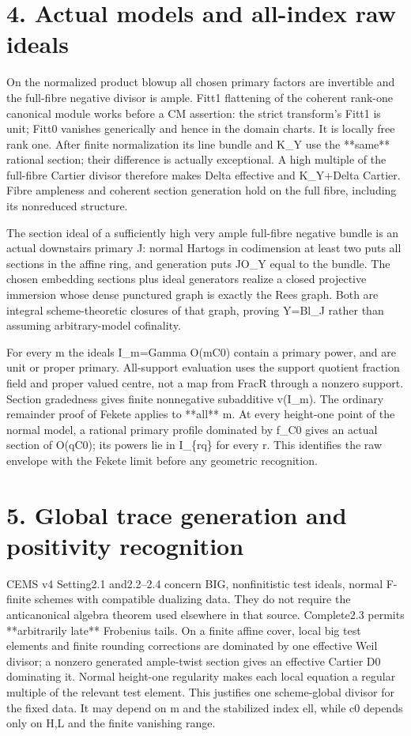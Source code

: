 \documentclass[11pt]{article}
\begin{document}
\section{4. Actual models and all-index raw ideals}

On the normalized product blowup all chosen primary factors are invertible and the full-fibre negative divisor is ample. Fitt1 flattening of the coherent rank-one canonical module works before a CM assertion: the strict transform's Fitt1 is unit; Fitt0 vanishes generically and hence in the domain charts. It is locally free rank one. After finite normalization its line bundle and K\_Y use the **same** rational section; their difference is actually exceptional. A high multiple of the full-fibre Cartier divisor therefore makes Delta effective and K\_Y+Delta Cartier. Fibre ampleness and coherent section generation hold on the full fibre, including its nonreduced structure.

The section ideal of a sufficiently high very ample full-fibre negative bundle is an actual downstairs primary J: normal Hartogs in codimension at least two puts all sections in the affine ring, and generation puts JO\_Y equal to the bundle. The chosen embedding sections plus ideal generators realize a closed projective immersion whose dense punctured graph is exactly the Rees graph. Both are integral scheme-theoretic closures of that graph, proving Y=Bl\_J rather than assuming arbitrary-model cofinality.

For every m the ideals I\_m=Gamma O(mC0) contain a primary power, and are unit or proper primary. All-support evaluation uses the support quotient fraction field and proper valued centre, not a map from FracR through a nonzero support. Section gradedness gives finite nonnegative subadditive v(I\_m). The ordinary remainder proof of Fekete applies to **all** m. At every height-one point of the normal model, a rational primary profile dominated by f\_C0 gives an actual section of O(qC0); its powers lie in I\_\{rq\} for every r. This identifies the raw envelope with the Fekete limit before any geometric recognition.

\section{5. Global trace generation and positivity recognition}

CEMS v4 Setting2.1 and2.2--2.4 concern BIG, nonfinitistic test ideals, normal F-finite schemes with compatible dualizing data. They do not require the anticanonical algebra theorem used elsewhere in that source. Complete2.3 permits **arbitrarily late** Frobenius tails. On a finite affine cover, local big test elements and finite rounding corrections are dominated by one effective Weil divisor; a nonzero generated ample-twist section gives an effective Cartier D0 dominating it. Normal height-one regularity makes each local equation a regular multiple of the relevant test element. This justifies one scheme-global divisor for the fixed data. It may depend on m and the stabilized index ell, while c0 depends only on H,L and the finite vanishing range.
\end{document}
